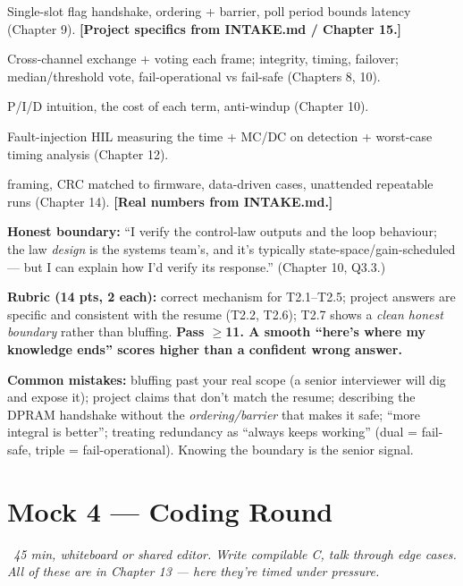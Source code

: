 Single-slot flag handshake, ordering + barrier, poll period bounds latency
(Chapter 9). \textbf{[Project specifics from INTAKE.md / Chapter 15.]}

Cross-channel exchange + voting each frame; integrity, timing, failover;
median/threshold vote, fail-operational vs fail-safe (Chapters 8, 10).

P/I/D intuition, the cost of each term, anti-windup (Chapter 10).

Fault-injection HIL measuring the time + MC/DC on detection + worst-case timing
analysis (Chapter 12).

 framing, CRC matched to firmware, data-driven cases, unattended
repeatable runs (Chapter 14). \textbf{[Real numbers from INTAKE.md.]}

\textbf{Honest boundary:} ``I verify the control-law outputs and the loop
behaviour; the law \emph{design} is the systems team's, and it's typically
state-space/gain-scheduled --- but I can explain how I'd verify its response.''
(Chapter 10, Q3.3.)

\begin{scorecard}
\textbf{Rubric (14 pts, 2 each):} correct mechanism for T2.1--T2.5; project
answers are specific and consistent with the resume (T2.2, T2.6); T2.7 shows a
\emph{clean honest boundary} rather than bluffing. \textbf{Pass $\ge$11. A smooth
``here's where my knowledge ends'' scores higher than a confident wrong
answer.}
\end{scorecard}

\textbf{Common mistakes:} bluffing past your real scope (a senior interviewer
will dig and expose it); project claims that don't match the resume; describing
the DPRAM handshake without the \emph{ordering/barrier} that makes it safe;
``more integral is better''; treating redundancy as ``always keeps working''
(dual = fail-safe, triple = fail-operational). Knowing the boundary is the
senior signal.

\section{Mock 4 --- Coding Round}
\emph{~45 min, whiteboard or shared editor. Write compilable C, talk through
edge cases. All of these are in Chapter 13 --- here they're timed under
pressure.}

